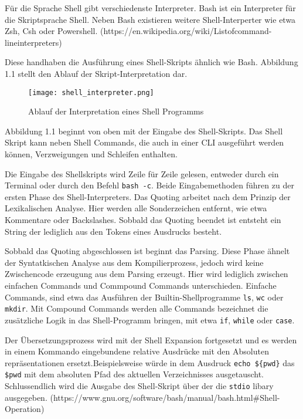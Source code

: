 Für die Sprache Shell gibt verschiedenste Interpreter. Bash ist ein Interpreter für die Skriptsprache Shell. Neben Bash existieren weitere Shell-Interperter wie etwa Zsh, Csh oder Powershell. (https://en.wikipedia.org/wiki/Listofcommand-lineinterpreters)

Diese handhaben die Ausführung eines Shell-Skripts ähnlich wie Bash. Abbildung 1.1 stellt den Ablauf der Skript-Interpretation dar.
\begin{figure}[h]
  \centering
  \caption{Ablauf der Interpretation eines Shell Programms}
  \texttt{[image: shell\_interpreter.png]}
  \label{fig:shell}
\end{figure}
\pagebreak

Abbildung 1.1 beginnt von oben mit der Eingabe des Shell-Skripts. Das Shell Skript kann neben Shell Commands, die auch in einer CLI ausgeführt werden können, Verzweigungen und Schleifen enthalten. 

Die Eingabe des Shellskripts wird Zeile für Zeile gelesen, entweder durch ein Terminal oder durch den Befehl \verb+bash -c+. 
Beide Eingabemethoden führen zu der ersten Phase des Shell-Interpreters. 
Das Quoting arbeitet nach dem Prinzip der Lexikalischen Analyse. Hier werden alle Sonderzeichen entfernt, wie etwa Kommentare oder Backslashes. Sobbald das Quoting beendet ist entsteht ein String der lediglich aus den Tokens eines Ausdrucks besteht. 
 
Sobbald das Quoting abgeschlossen ist beginnt das Parsing. Diese Phase ähnelt der Syntatkischen Analyse aus dem Kompilierprozess, jedoch wird keine Zwischencode erzeugung aus dem Parsing erzeugt. Hier wird lediglich zwischen einfachen Commands und Commpound Commands unterschieden. 
Einfache Commands, sind etwa das Ausführen der Builtin-Shellprogramme \verb+ls+, \verb+wc+ oder \verb+mkdir+. Mit Compound Commands werden alle Commands bezeichnet die zusätzliche Logik in das Shell-Programm bringen, mit etwa \verb+if+, \verb+while+ oder \verb+case+.  

Der Übersetzungsprozess wird mit der Shell Expansion fortgesetzt und es werden in einem Kommando eingebundene relative Ausdrücke mit den Absoluten repräsentationen ersetzt.Beispielsweise würde in dem Ausdruck  \verb+echo ${pwd}+ das \verb+$pwd+ mit dem absoluten Pfad des aktuellen Verzeichnisses ausgetauscht.
Schlussendlich wird die Ausgabe des Shell-Skript über der die \verb+stdio+ libary ausgegeben. 
(https://www.gnu.org/software/bash/manual/bash.html#Shell-Operation)

